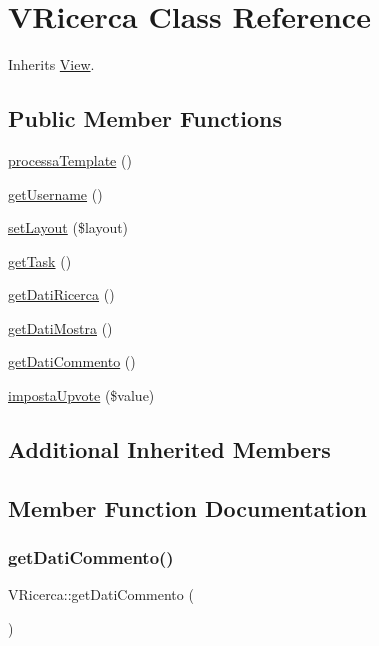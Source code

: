 \hypertarget{class_v_ricerca}{}\section{V\+Ricerca Class Reference}
\label{class_v_ricerca}


Inherits \mbox{\hyperlink{class_view}{View}}.

\subsection*{Public Member Functions}
\begin{DoxyCompactItemize}
\item 
\mbox{\hyperlink{class_v_ricerca_accab76d9a06a79072c80b4014fd9f66b}{processa\+Template}} ()
\item 
\mbox{\hyperlink{class_v_ricerca_a132e577e786b857bb1381258835dd710}{get\+Username}} ()
\item 
\mbox{\hyperlink{class_v_ricerca_ac5f6a699be0236cd12a8954b309803c0}{set\+Layout}} (\$layout)
\item 
\mbox{\hyperlink{class_v_ricerca_ae254a1328432be4162826bf9b34035c6}{get\+Task}} ()
\item 
\mbox{\hyperlink{class_v_ricerca_ac0f1b275ec5c9e97bf01548ee679102a}{get\+Dati\+Ricerca}} ()
\item 
\mbox{\hyperlink{class_v_ricerca_af32f2ee10d133b234eeb8bd3359569a1}{get\+Dati\+Mostra}} ()
\item 
\mbox{\hyperlink{class_v_ricerca_a6effafa27453d04f9e50d6f4cf690732}{get\+Dati\+Commento}} ()
\item 
\mbox{\hyperlink{class_v_ricerca_a30341bd57866dd8155655fa8b64ed74c}{imposta\+Upvote}} (\$value)
\end{DoxyCompactItemize}
\subsection*{Additional Inherited Members}


\subsection{Member Function Documentation}
\mbox{\label{class_v_ricerca_a6effafa27453d04f9e50d6f4cf690732}} 
\subsubsection{\texorpdfstring{get\+Dati\+Commento()}{getDatiCommento()}}
{\footnotesize\ttfamily V\+Ricerca\+::get\+Dati\+Commento (\begin{DoxyParamCaption}{ }\end{DoxyParamCaption})}

